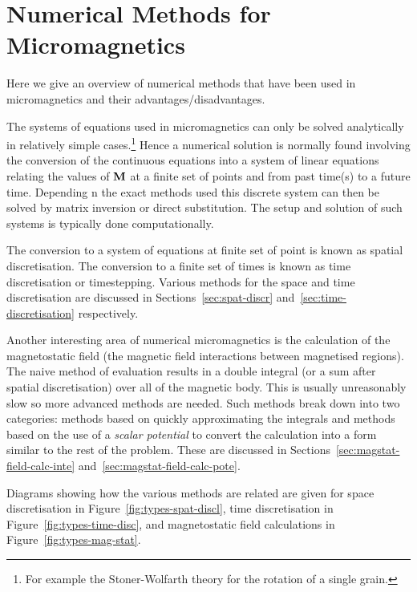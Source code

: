 \chapter{Numerical Methods for Micromagnetics}
\label{sec:numer-meth-micr}

Here we give an overview of numerical methods that have been used in micromagnetics and their advantages/disadvantages.



The systems of equations used in micromagnetics can only be solved analytically in relatively simple cases.\footnote{For example the Stoner-Wolfarth theory for the rotation of a single grain.\cite{Stoner1948a}}\cite{Aharoni1996} Hence a numerical solution is normally found involving the conversion of the continuous equations into a system of linear equations relating the values of $\mathbf{M}$ at a finite set of points and from past time(s) to a future time. Depending n the exact methods used this discrete system can then be solved by matrix inversion or direct substitution. The setup and solution of such systems is typically done computationally.

The conversion to a system of equations at finite set of point is known as spatial discretisation. The conversion to a finite set of times is known as time discretisation or timestepping. Various methods for the space and time discretisation are discussed in Sections~\ref{sec:spat-discr} and~\ref{sec:time-discretisation} respectively.

Another interesting area of numerical micromagnetics is the calculation of the magnetostatic field (\ie the magnetic field interactions between magnetised regions). The naive method of evaluation results in a double integral (or a sum after spatial discretisation) over all of the magnetic body. This is usually unreasonably slow so more advanced methods are needed. Such methods break down into two categories: methods based on quickly approximating the integrals and methods based on the use of a \emph{scalar potential} to convert the calculation into a form similar to the rest of the problem. These are discussed in Sections~\ref{sec:magstat-field-calc-inte} and~\ref{sec:magstat-field-calc-pote}.

Diagrams showing how the various methods are related are given for space discretisation in Figure~\ref{fig:types-spat-discl}, time discretisation in Figure~\ref{fig:types-time-disc}, and magnetostatic field calculations in Figure~\ref{fig:types-mag-stat}.

